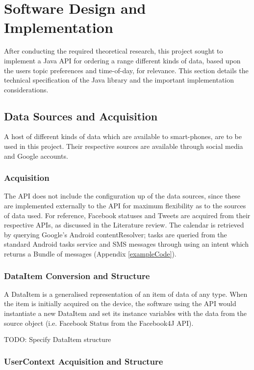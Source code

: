 \chapter{Software Design and Implementation}

After conducting the required theoretical research, this project sought to implement a Java API for ordering a range different kinds of data, based upon the users topic preferences and time-of-day, for relevance. This section details the technical specification of the Java library and the important implementation considerations.

\section{Data Sources and Acquisition}

A host of different kinds of data which are available to smart-phones, are to be used in this project. Their respective sources are available through social media and Google accounts. 

\subsection{Acquisition}

The API does not include the configuration up of the data sources, since these are implemented externally to the API for maximum flexibility as to the sources of data used. For reference, Facebook statuses \cite{Facebook4JExample} and Tweets \cite{Twitter4JExample} are acquired from their respective APIs, as discussed in the Literature review. The calendar is retrieved by querying Google's Android contentResolver; tasks are queried from the standard Android tasks service and SMS messages through using an intent which returns a Bundle of messages (Appendix \ref{exampleCode}).

\subsection{DataItem Conversion and Structure}

A DataItem is a generalised representation of an item of data of any type. When the item is initially acquired on the device, the software using the API would instantiate a new DataItem and set its instance variables with the data from the source object (i.e. Facebook Status from the Facebook4J API). 

TODO: Specify DataItem structure

\subsection{UserContext Acquisition and Structure}

